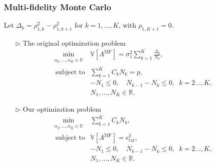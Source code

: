 \documentclass{beamer}
\begin{document}
\begin{frame}[t]
    \frametitle{Multi-fidelity Monte Carlo}
    {\footnotesize Let $\Delta_k = \rho_{1,k}^2 - \rho_{1,k+1}^2$ for $k = 1, \dots, K$, with $\rho_{1,K+1} = 0$.}
    \begin{itemize}[leftmargin=5pt] 
     \vspace{3mm}
        \item[$\triangleright$] The original optimization problem
        {\footnotesize
        \begin{equation*}\label{eq:Optimization_pb_sample_size}
            \begin{array}{ll}
            \min \limits_{\begin{array}{c}
        \scriptstyle \alpha_2,\ldots,\alpha_K\in \mathbb{R}
        \end{array}} &\mathbb{V}\left[A^{\text{MF}}\right]=\sigma_1^2\sum_{k=1}^K\frac{\Delta_{k}}{N_k},\\
               \;\,\text{subject to} &\displaystyle\sum\limits_{k=1}^K C_kN_k=p,\\[2pt]
               &\displaystyle -N_1\le 0,\quad \displaystyle N_{k-1}-N_k\le 0, \;\; k=2\ldots,K,\\
               &N_1,\ldots, N_K\in \mathbb{R}. 
            \end{array}
        \end{equation*}
        }

        \item[$\triangleright$] Our optimization problem
        {\footnotesize
        \begin{equation*}\label{eq:Optimization_pb_sample_size}
            \begin{array}{ll}
            \min \limits_{\begin{array}{c}
        \scriptstyle \alpha_2,\ldots,\alpha_K\in \mathbb{R}
        \end{array}} &\sum\limits_{k=1}^K C_kN_k,\\
               \;\,\text{subject to} &\displaystyle\mathbb{V}\left[A^{\text{MF}}\right]=\epsilon_{\text{tar}}^2,\\[2pt]
               &\displaystyle -N_1\le 0,\quad \displaystyle N_{k-1}-N_k\le 0, \;\; k=2\ldots,K,\\
               &N_1,\ldots, N_K\in \mathbb{R}. 
            \end{array}
        \end{equation*}
        }
    \end{itemize}
\end{frame}
\end{document}

